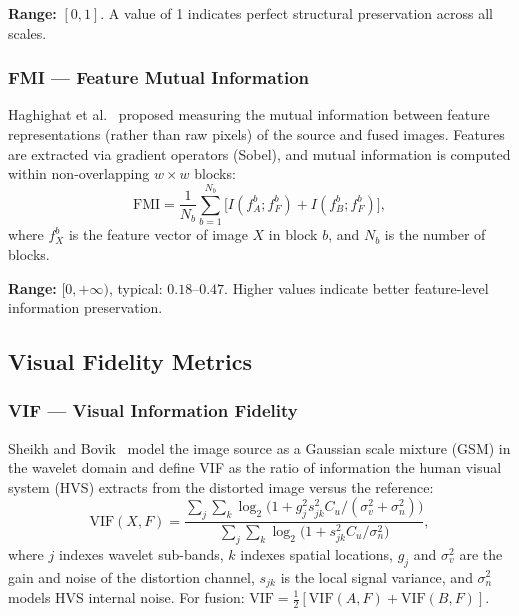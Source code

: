 \documentclass[a4paper,12pt]{article}
\begin{document}
\textbf{Range:} $[0,1]$. A value of 1 indicates perfect structural preservation
across all scales.

\subsubsection{FMI --- Feature Mutual Information}

Haghighat et al.~\cite{haghighat2011} proposed measuring the mutual information
between feature representations (rather than raw pixels) of the source and fused images.
Features are extracted via gradient operators (Sobel), and mutual information
is computed within non-overlapping $w \times w$ blocks:
\begin{equation}
  \text{FMI} = \frac{1}{N_b} \sum_{b=1}^{N_b}
    \bigl[ I(f_A^b; f_F^b) + I(f_B^b; f_F^b) \bigr],
\end{equation}
where $f_X^b$ is the feature vector of image $X$ in block $b$, and $N_b$ is the
number of blocks.

\textbf{Range:} $[0, +\infty)$, typical: $0.18$--$0.47$.
Higher values indicate better feature-level information preservation.

\subsection{Visual Fidelity Metrics}

\subsubsection{VIF --- Visual Information Fidelity}

Sheikh and Bovik~\cite{sheikh2006} model the image source as a Gaussian scale
mixture (GSM) in the wavelet domain and define VIF as the ratio of information
the human visual system (HVS) extracts from the distorted image versus the
reference:
\begin{equation}
  \text{VIF}(X,F) = \frac{\sum_j \sum_k \log_2\!\bigl(1 + g_j^2 s_{jk}^2 C_u / (\sigma_v^2 + \sigma_n^2)\bigr)}
                         {\sum_j \sum_k \log_2\!\bigl(1 + s_{jk}^2 C_u / \sigma_n^2\bigr)},
\end{equation}
where $j$ indexes wavelet sub-bands, $k$ indexes spatial locations, $g_j$ and
$\sigma_v^2$ are the gain and noise of the distortion channel, $s_{jk}$ is the
local signal variance, and $\sigma_n^2$ models HVS internal noise.
For fusion: $\text{VIF} = \frac{1}{2}[\text{VIF}(A,F) + \text{VIF}(B,F)]$.
\end{document}
